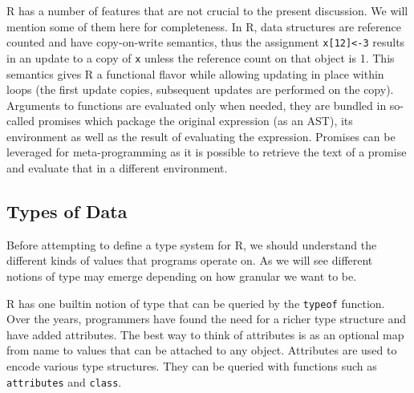 \documentclass[acmsmall,10pt,review,anonymous]{acmart}\settopmatter{printfolios=true,printccs=false,printacmref=false}
\newcommand{\code}[1]{\lstinline|#1|\xspace}
\begin{document}
R has a number of features that are not crucial to the present
discussion. We will mention some of them here for completeness.  In R, data
structures are reference counted and have copy-on-write semantics, thus the
assignment \code{x[12]<-3} results in an update to a copy of \code{x} unless
the reference count on that object is 1.  This semantics gives R a
functional flavor while allowing updating in place within loops (the first
update copies, subsequent updates are performed on the copy). Arguments to
functions are evaluated only when needed, they are bundled in so-called
promises which package the original expression (as an AST), its environment
as well as the result of evaluating the expression. Promises can be
leveraged for meta-programming as it is possible to retrieve the text of a
promise and evaluate that in a different environment.

\subsection{Types of Data}

Before attempting to define a type system for R, we should understand the
different kinds of values that programs operate on.  As we will see
different notions of type may emerge depending on how granular we want to
be.

\renewcommand{\k}[1]{{\tt #1}\xspace}

R has one builtin notion of type that can be queried by the \k{typeof}
function. Over the years, programmers have found the need for a richer type
structure and have added attributes. The best way to think of attributes is
as an optional map from name to values that can be attached to any object.
Attributes are used to encode various type structures. They can be queried
with functions such as \k{attributes} and \k{class}.
\end{document}
